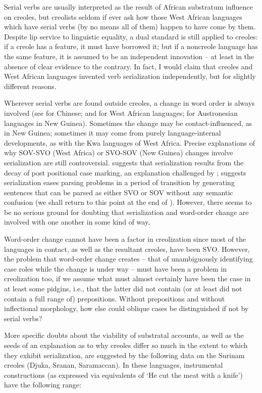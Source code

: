 Serial verbs are usually interpreted as the result of African substratum influence on creoles, but creolists seldom if ever ask how those West African languages which have serial verbs (by no means all of them) happen to have come by them. Despite lip service to linguistic equality, a dual standard is still applied to creoles: if a creole has a feature, it must have borrowed it; but if a noncreole language has the same feature, it is assumed to be an independent innovation -- at least in the absence of clear evidence to the contrary. In fact, I would claim that creoles and West African languages invented verb serialization independently, but for slightly different reasons.

Wherever serial verbs are found outside creoles, a change in word order is always involved (see \citet{LiEtAl1974} for Chinese; \citet{Givón1974} and \citet{Hyman1974} for West African languages; \citet{Bradshaw1979} for Austronesian languages in New Guinea). Sometimes the change may be contact-influenced, as in New Guinea; sometimes it may come from purely language-internal developments, as with the Kwa languages of West Africa. Precise explanations of why SOV-SVO (West Africa) or SVO-SOV (New Guinea) changes involve serialization are still controversial. \citet{Givón1974} suggests that serialization results from the decay of post positional case marking, an explanation chal\-lenged by \citet{Hyman1974}; \citet{Bradshaw1979} suggests serialization eases parsing problems in a period of transition by generating sentences that can be parsed as either SVO or SOV without any semantic confu\-sion (we shall return to this point at the end of ). However, there seems to be no serious ground for doubting that serialization and word-order change are involved with one another in some kind of way.

Word-order change cannot have been a factor in creolization since most of the languages in contact, as well as the resultant creoles, have been SVO. However, the problem that word-order change creates --
that of unambiguously identifying case roles while the change is under way -- must have been a problem in creolization too, if we assume what must almost certainly have been the case in at least some pidgins, i.e., that the latter did not contain (or at least did not contain a full range of) prepositions. Without prepositions and without inflectional morphology, how else could oblique cases be distinguished if not by serial verbs?

More specific doubts about the viability of substratal accounts, as well as the seeds of an explanation as to why creoles differ so much in the extent to which they exhibit serialization, are suggested by the following data on the Surinam creoles (Djuka, Sranan, Saramaccan). In these languages, instrumental constructions (as expressed via equiva\-lents of `He cut the meat with a knife') have the following range:

